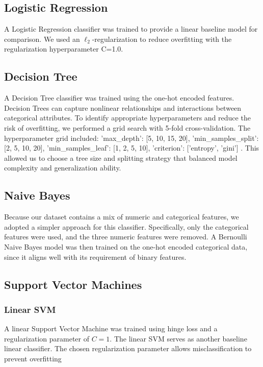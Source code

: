 \documentclass[conference]{IEEEtran}
\begin{document}
\subsection{Logistic Regression}
A Logistic Regression classifier was trained to provide a linear baseline model for comparison. We used an $\ell_2$-regularization to reduce overfitting with the regularization hyperparameter C=1.0. 

\subsection{Decision Tree}
A Decision Tree classifier was trained using the one-hot encoded features. Decision Trees can capture nonlinear relationships and interactions between categorical attributes. To identify appropriate hyperparameters and reduce the risk of overfitting, we performed a grid search with 5-fold cross-validation. The hyperparameter grid included:{ 'max\_depth': [5, 10, 15, 20], 'min\_samples\_split': [2, 5, 10, 20], 'min\_samples\_leaf': [1, 2, 5, 10], 'criterion': ['entropy', 'gini'] }. 
This allowed us to choose a tree size and splitting strategy that balanced model complexity and generalization ability.

\subsection{Naive Bayes}
Because our dataset contains a mix of numeric and categorical features, we adopted a simpler approach for this classifier. Specifically, only the categorical features were used, and the three numeric features were removed. A Bernoulli Naive Bayes model was then trained on the one-hot encoded categorical data, since it aligns well with its requirement of binary features.

\subsection{Support Vector Machines}

\subsubsection{Linear SVM}

A linear Support Vector Machine was trained using hinge loss and a regularization parameter of $C=1$. The linear SVM serves as another baseline linear classifier. The chosen regularization parameter allows misclassification to prevent overfitting
\end{document}

